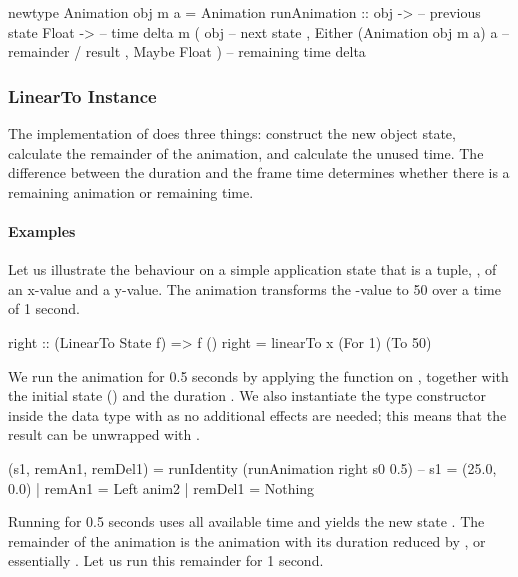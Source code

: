 \begin{code}
newtype Animation obj m a = Animation { runAnimation ::
    obj ->                           -- previous state
    Float ->                         -- time delta
    m ( obj                          -- next state
      , Either (Animation obj m a) a -- remainder / result
      , Maybe Float )}               -- remaining time delta
\end{code}

\subsubsection{LinearTo Instance}

The  implementation of  does three things: construct
the new object state, calculate the remainder of the animation, and calculate
the unused time. The difference between the  duration and the
frame time determines whether there is a remaining  animation or
remaining time.

\paragraph{Examples}

Let us illustrate the behaviour on a simple application
state that is a tuple, , of an {x}-value and a {y}-value.
The  animation transforms the -value to 50 over a time of 1
second.

\begin{code}
right :: (LinearTo State f) => f ()
right = linearTo x (For 1) (To 50)
\end{code}

We run the animation for 0.5 seconds by applying the  function
on , together with the initial state () and the duration . We also instantiate the  type constructor  inside
the  data type with  as no additional effects are
needed; this means that the result can be unwrapped with
.

\begin{code}
(s1, remAn1, remDel1) = runIdentity (runAnimation right s0 0.5)
-- s1 = (25.0, 0.0) | remAn1 = Left anim2 | remDel1 = Nothing
\end{code}

Running  for 0.5 seconds uses all available time and yields the new state
. The remainder of
the animation is the  animation with its duration reduced by , or essentially . Let us run this
remainder for 1 second.

